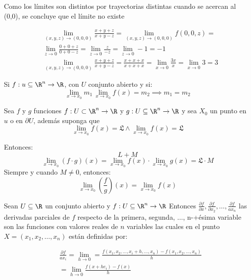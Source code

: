 Como los límites son distintos por trayectorias distintas cuando se acercan al (0,0), se concluye que el límite no existe

\begin{align*}
	 & \lim_{(x,y,z)\to (0,0,0)}\frac{x+y+z}{x+y-z}=\lim_{(x,y,z)\to (0,0,0)} f(0,0,z)=                             \\
	 & \lim_{z\to 0}\frac{0+0+z}{0+0-z}=\lim_{z\to 0}\frac{z}{-z}=\lim_{z\to 0}-1=-1                                \\
	 & \lim_{(x,y,z)\to (0,0,0)}\frac{x+y+z}{x+y-z}=\frac{x+x+x}{x+x+x}=\lim_{x\to 0}\frac{3x}{x}=\lim_{x\to 0} 3=3
\end{align*}

\begin{theorem}
	Si $f:u\subseteq \R^n\to\R$, con $U$ conjunto abierto y si:
	\begin{equation*}
		\lim_{x\to x_0}m_1\, \lim_{x\to x_0}f(x)=m_2\implies m_1=m_2
	\end{equation*}
\end{theorem}

\begin{theorem}
	Sea $f$ y $g$ funciones $f:U\subset \R^n\to \R$ y
	$g:U\subseteq \R^n\to \R$
	y sea $X_0$ un punto en $u$ o en $\partial U$, además suponga que
	\begin{equation*}
		\lim_{x\to x_0}f(x)=\mathfrak{L}\land \lim_{x\to x_0}f(x)=\mathfrak{L}
	\end{equation*}

	Entonces:
	\begin{equation}
		L+M
	\end{equation}
	\begin{equation}
		\lim_{x\to x_0}(f\cdot g)(x)=\lim_{x\to x_0}f(x)\cdot \lim_{x\to x_0}g(x)=\mathfrak{L}\cdot M
	\end{equation}
	Siempre y cuando $M\neq 0$, entonces:
	\begin{equation}
		\lim_{x\to x_0}\left(\frac{f}{g}\right)(x)=\lim_{x\to x_0}f(x)
	\end{equation}
\end{theorem}

\begin{definition}
	Sean $U\subseteq \R$ un conjunto abierto y
	$f:U\subseteq \R^n\to \R$
	Entonces $\frac{\partial f}{\partial x},\frac{\partial f}{\partial x_2},\dots,\frac{\partial f}{ax_n}$ las derivadas parciales de $f$ respecto de la primera, segunda, $\dots$, n-+ésima variable son las funciones con valores reales
	de $n$ variables las cuales en el punto $X=\left(x_1,x_2,\dots,x_n\right)$ están definidas por:
\end{definition}
\begin{align*}
	 & \frac{\partial f}{ax_i}=\lim_{h\to 0}=\frac{f\left(x_1,x_2,\dots,x_i+h,\dots,x_n \right)-f\left(x_1,x_2,\dots,x_n \right)}{h} \\
	 & =\lim_{h\to 0}\frac{f(x+he_i)-f(x)}{h}
\end{align*}

